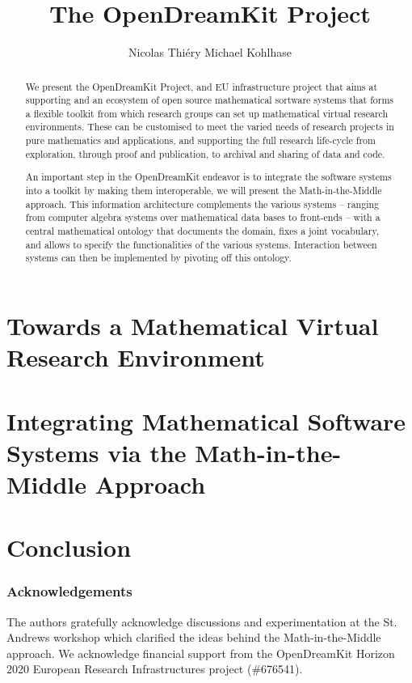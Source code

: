 \documentclass[orivec]{llncs}
\title{The OpenDreamKit Project}
\author{Nicolas Thi\'ery\inst{1} Michael Kohlhase\inst{2}}
\institute{Universit\'e Paris-Sud, Paris, France\and
Jacobs University, Bremen, Germany}
\begin{document}
\maketitle
\begin{abstract}
  We present the OpenDreamKit Project, and EU infrastructure project that aims at
  supporting and an ecosystem of open source mathematical sortware systems that forms a
  flexible toolkit from which research groups can set up mathematical virtual research
  environments. These can be customised to meet the varied needs of research projects in
  pure mathematics and applications, and supporting the full research life-cycle from
  exploration, through proof and publication, to archival and sharing of data and
  code. 

  An important step in the OpenDreamKit endeavor is to integrate the software systems into
  a toolkit by making them interoperable, we will present the Math-in-the-Middle
  approach. This information architecture complements the various systems -- ranging
  from computer algebra systems over mathematical data bases to front-ends -- with a
  central mathematical ontology that documents the domain, fixes a joint vocabulary, and
  allows to specify the functionalities of the various systems. Interaction between
  systems can then be implemented by pivoting off this ontology.
\end{abstract}

\section{Towards a Mathematical Virtual Research Environment}

\section{Integrating Mathematical Software Systems via the Math-in-the-Middle Approach}
\section{Conclusion}
\subsubsection*{Acknowledgements}
The authors gratefully acknowledge discussions and experimentation at the St. Andrews
workshop which clarified the ideas behind the
Math-in-the-Middle approach. We acknowledge financial support from the OpenDreamKit
Horizon 2020 European Research Infrastructures project (\#676541).

\printbibliography
\end{document}
